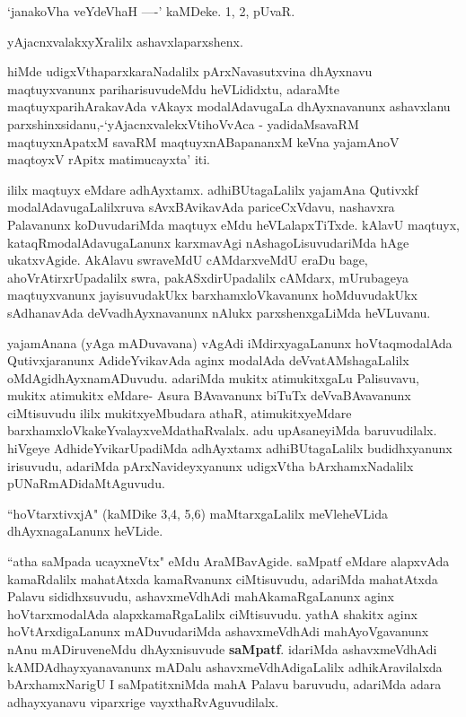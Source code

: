 \begin{artha}
`janakoVha veYdeVhaH ----' kaMDeke. 1, 2, pUvaR.

yAjacnxvalakxyXralilx ashavxlaparxshenx.

hiMde udigxVthaparxkaraNadalilx pArxNavasutxvina dhAyxnavu maqtuyxvanunx 
pariharisuvudeMdu heVLididxtu, adaraMte maqtuyxparihArakavAda vAkayx modalAdavugaLa 
dhAyxnavanunx ashavxlanu parxshinxsidanu,-`yAjacnxvalekxVtihoVvAca - yadidaMsavaRM maqtuyxnA\s\s patxM savaRM maqtuyxnA\s BapananxM keVna yajamAnoV maqtoyxV rApitx matimucayxta' iti.

ililx maqtuyx eMdare adhAyxtamx. adhiBUtagaLalilx yajamAna Qutivxkf 
modalAdavugaLalilxruva sAvxBAvikavAda pariceCxVdavu, nashavxra Palavanunx koDuvudariMda 
maqtuyx eMdu heVLalapxTiTxde. kAlavU maqtuyx, kataqRmodalAdavugaLanunx karxmavAgi 
nAshagoLisuvudariMda hAge ukatxvAgide. AkAlavu swraveMdU cAMdarxveMdU eraDu bage, 
ahoVrAtirxrUpadalilx swra, pakASxdirUpadalilx cAMdarx, mUrubageya maqtuyxvanunx 
jayisuvudakUkx barxhamxloVkavanunx hoMduvudakUkx sAdhanavAda deVvadhAyxnavanunx nAlukx 
parxshenxgaLiMda heVLuvanu.
\end{artha}

\centerline{}

\begin{artha}
yajamAnana (yAga mADuvavana) vAgAdi iMdirxyagaLanunx hoVtaqmodalAda Qutivxjaranunx AdideYvikavAda aginx modalAda deVvatAMshagaLalilx oMdAgidhAyxnamADuvudu. adariMda mukitx atimukitxgaLu Palisuvavu, mukitx atimukitx eMdare- Asura BAvavanunx biTuTx deVvaBAvavanunx ciMtisuvudu ililx mukitxyeMbudara athaR, atimukitxyeMdare barxhamxloVkakeYvalayxveMdathaRvalalx. adu upAsaneyiMda baruvudilalx. hiVgeye AdhideYvikarUpadiMda adhAyxtamx adhiBUtagaLalilx budidhxyanunx irisuvudu, adariMda pArxNavideyxyanunx udigxVtha bArxhamxNadalilx pUNaRmADidaMtAguvudu.
\end{artha}

\begin{artha}
``hoVtarxtivxjA" (kaMDike 3,4, 5,6) maMtarxgaLalilx meVleheVLida dhAyxnagaLanunx heVLide.
\end{artha}

\centerline{}

\begin{artha}
``atha saMpada ucayxneVtx" eMdu AraMBavAgide. saMpatf eMdare alapxvAda kamaRdalilx mahatAtxda kamaRvanunx ciMtisuvudu, adariMda mahatAtxda Palavu sididhxsuvudu, ashavxmeVdhAdi mahAkamaRgaLanunx aginx hoVtarxmodalAda alapxkamaRgaLalilx ciMtisuvudu.  yathA shakitx aginx hoVtArxdigaLanunx mADuvudariMda ashavxmeVdhAdi mahAyoVgavanunx nAnu mADiruveneMdu dhAyxnisuvude \textbf{saMpatf}. idariMda ashavxmeVdhAdi kAMDAdhayxyanavanunx mADalu ashavxmeVdhAdigaLalilx adhikAravilalxda bArxhamxNarigU I saMpatitxniMda mahA Palavu baruvudu, adariMda adara adhayxyanavu viparxrige vayxthaRvAguvudilalx.
\end{artha}

